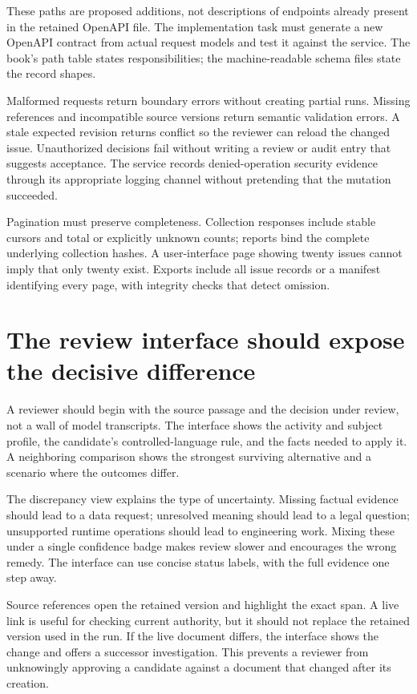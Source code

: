 These paths are proposed additions, not descriptions of endpoints already present
in the retained OpenAPI file. The implementation task must generate a new OpenAPI
contract from actual request models and test it against the service. The book's
path table states responsibilities; the machine-readable schema files state the
record shapes.

Malformed requests return boundary errors without creating partial runs. Missing
references and incompatible source versions return semantic validation errors.
A stale expected revision returns conflict so the reviewer can reload the changed
issue. Unauthorized decisions fail without writing a review or audit entry that
suggests acceptance. The service records denied-operation security evidence
through its appropriate logging channel without pretending that the mutation
succeeded.

Pagination must preserve completeness. Collection responses include stable cursors
and total or explicitly unknown counts; reports bind the complete underlying
collection hashes. A user-interface page showing twenty issues cannot imply that
only twenty exist. Exports include all issue records or a manifest identifying
every page, with integrity checks that detect omission.

\section{The review interface should expose the decisive difference}
\label{merge:M08:08}


A reviewer should begin with the source passage and the decision under review,
not a wall of model transcripts. The interface shows the activity and subject
profile, the candidate's controlled-language rule, and the facts needed to apply
it. A neighboring comparison shows the strongest surviving alternative and a
scenario where the outcomes differ.

The discrepancy view explains the type of uncertainty. Missing factual evidence
should lead to a data request; unresolved meaning should lead to a legal question;
unsupported runtime operations should lead to engineering work. Mixing these
under a single confidence badge makes review slower and encourages the wrong
remedy. The interface can use concise status labels, with the full evidence one
step away.

Source references open the retained version and highlight the exact span. A live
link is useful for checking current authority, but it should not replace the
retained version used in the run. If the live document differs, the interface
shows the change and offers a successor investigation. This prevents a reviewer
from unknowingly approving a candidate against a document that changed after
its creation.

